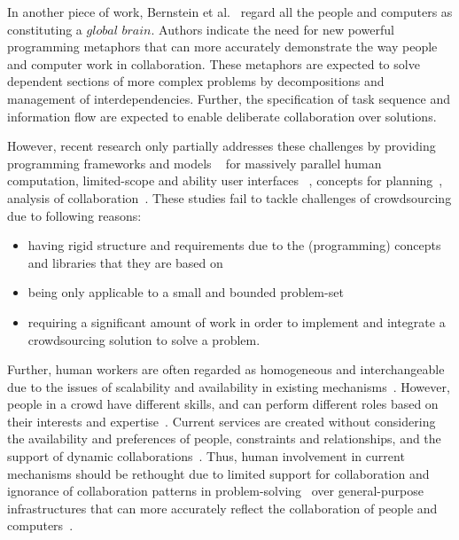 In another piece of work, Bernstein et al.~\cite{Bernstein2012} regard all the 
people and computers as constituting a $global$ $brain$. Authors indicate the 
need for new powerful programming metaphors that can more accurately 
demonstrate the way people and computer work in collaboration. These 
metaphors are expected to solve dependent sections of more complex problems by 
decompositions and management of interdependencies. Further, the specification 
of task sequence and information flow are expected to enable deliberate 
collaboration over solutions.

However, recent research only partially addresses these challenges by 
providing programming frameworks and models
~\cite{Kittur2011, Ahmad2011, Kokciyan2012, Little2009, Minder2011, Barowy2012, Kulkarni2012, Kittur2012} 
for massively parallel human computation, limited-scope and ability user interfaces
~\cite{Marcus2011, Bernstein2010, Marcus2011b, Rzeszotarski2012}, 
concepts for planning~\cite{Zhang2012}, 
analysis of collaboration~\cite{Dorn2012}. 
These studies fail to tackle challenges of crowdsourcing due to following reasons:
\begin{itemize}
	\item having rigid structure and requirements due to the (programming) concepts and 
	libraries that they are based on
	\item being only applicable to a small and bounded problem-set
	\item requiring a significant amount of work in order to implement and integrate 
	a crowdsourcing solution to solve a problem.
\end{itemize}


Further, human workers are often regarded as homogeneous and 
interchangeable due to the issues of scalability and availability in existing 
mechanisms~\cite{Ahmad2011}. However, people in a crowd have different 
skills, and can perform different roles based on their interests and expertise~\cite{Zhang2011}. 
Current services are created without considering the availability and preferences of 
people, constraints and relationships, and the support of dynamic 
collaborations~\cite{Schall2010}. Thus, human involvement in current mechanisms should 
be rethought due to limited support for collaboration and 
ignorance of collaboration patterns in problem-solving~\cite{Dorn2012a} 
over general-purpose infrastructures that can more accurately reflect 
the collaboration of people and computers~\cite{Bernstein2012, Minder2012}.


